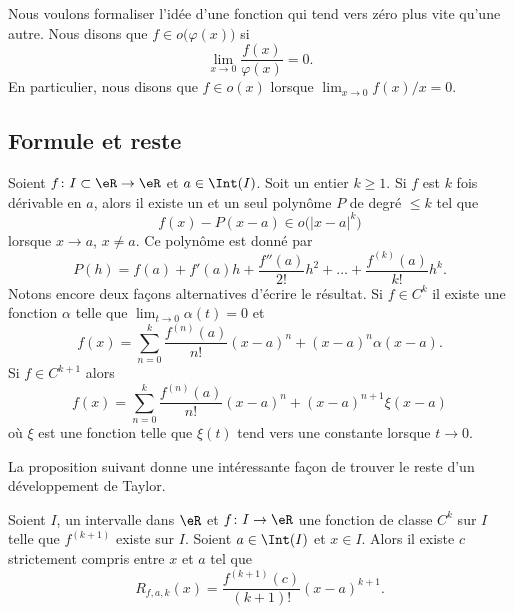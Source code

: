 Nous voulons formaliser l'idée d'une fonction qui tend vers zéro \og plus vite\fg{} qu'une autre. Nous disons que $f\in o\big(\varphi(x)\big)$ si
\begin{equation}
	\lim_{x\to 0} \frac{ f(x) }{ \varphi(x) }=0.
\end{equation}
En particulier, nous disons que $f\in o(x)$ lorsque $\lim_{x\to 0} f(x)/x=0$.

\subsection{Formule et reste}

\begin{proposition}		\label{PropDevTaylorPol}
    Soient $f\colon I\subset\eR\to \eR$ et $a\in\Int(I)$. Soit un entier $k\geq 1$. Si $f$ est $k$ fois dérivable en $a$, alors il existe un et un seul polynôme $P$ de degré $\leq k$ tel que
    \begin{equation}
        f(x)-P(x-a)\in o\big( | x-a |^k \big)
    \end{equation}
    lorsque $x\to a$, $x\neq a$. Ce polynôme  est donné par
    \begin{equation}
        P(h)=f(a)+f'(a)h+\frac{ f''(a) }{ 2! }h^2+\ldots+\frac{ f^{(k)}(a) }{ k! }h^k.
    \end{equation}
    Notons encore deux façons alternatives d'écrire le résultat. Si \( f\in C^k\) il existe une fonction \( \alpha\) telle que \( \lim_{t\to 0} \alpha(t)=0\) et
    \begin{equation}
        f(x)=\sum_{n=0}^k\frac{ f^{(n)}(a) }{ n! }(x-a)^n+(x-a)^n\alpha(x-a).
    \end{equation}
    Si \( f\in C^{k+1}\) alors
    \begin{equation}        \label{EquQtpoN}
        f(x)=\sum_{n=0}^k\frac{ f^{(n)}(a) }{ n! }(x-a)^n+(x-a)^{n+1}\xi(x-a)
    \end{equation}
    où \( \xi\) est une fonction telle que \( \xi(t)\) tend vers une constante lorsque \( t\to 0\).
\end{proposition}

La proposition suivant donne une intéressante façon de trouver le reste d'un développement de Taylor.
\begin{proposition}		\label{PropResteTaylorc}
Soient $I$, un intervalle dans $\eR$ et $f\colon I\to \eR$ une fonction de classe $C^k$ sur $I$ telle que $f^{(k+1)}$ existe sur $I$. Soient $a\in\Int(I)$ et $x\in I$. Alors il existe $c$ strictement compris entre $x$ et $a$ tel que 
\begin{equation}
	R_{f,a,k}(x)=\frac{ f^{(k+1)}(c) }{ (k+1)! }(x-a)^{k+1}.
\end{equation}
\end{proposition}

